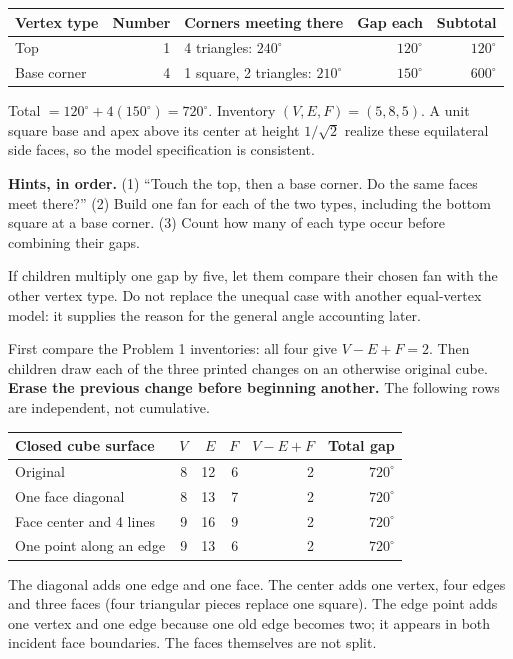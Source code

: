 \documentclass[11pt,letterpaper]{article}
\newcommand{\sub}[1]{\par\vspace{3pt}{\bfseries #1}\par}
\newcommand{\hints}[3]{\textbf{Hints, in order.} (1) #1 (2) #2 (3) #3\par}
\newcommand{\degc}{^{\circ}}
\begin{document}
\begin{center}
\begin{tabular}{|l|r|l|r|r|}\hline
Vertex type & Number & Corners meeting there & Gap each & Subtotal\\\hline
Top & 1 & 4 triangles: $240\degc$ & $120\degc$ & $120\degc$\\
Base corner & 4 & 1 square, 2 triangles: $210\degc$ & $150\degc$ & $600\degc$\\\hline
\end{tabular}
\end{center}
Total $=120\degc+4(150\degc)=720\degc$. Inventory $(V,E,F)=(5,8,5)$. A unit square base and apex above its center at height $1/\sqrt2$ realize these equilateral side faces, so the model specification is consistent.

\hints{``Touch the top, then a base corner. Do the same faces meet there?''}{Build one fan for each of the two types, including the bottom square at a base corner.}{Count how many of each type occur before combining their gaps.}
If children multiply one gap by five, let them compare their chosen fan with the other vertex type. Do not replace the unequal case with another equal-vertex model: it supplies the reason for the general angle accounting later.

\sub{Problem 6 / student p.6 / upper concrete core or return visit}
First compare the Problem 1 inventories: all four give $V-E+F=2$. Then children draw each of the three printed changes on an otherwise original cube. \textbf{Erase the previous change before beginning another.} The following rows are independent, not cumulative.

\begin{center}
\begin{tabular}{|l|r|r|r|r|r|}\hline
Closed cube surface & $V$ & $E$ & $F$ & $V-E+F$ & Total gap\\\hline
Original & 8 & 12 & 6 & 2 & $720\degc$\\
One face diagonal & 8 & 13 & 7 & 2 & $720\degc$\\
Face center and 4 lines & 9 & 16 & 9 & 2 & $720\degc$\\
One point along an edge & 9 & 13 & 6 & 2 & $720\degc$\\\hline
\end{tabular}
\end{center}
The diagonal adds one edge and one face. The center adds one vertex, four edges and three faces (four triangular pieces replace one square). The edge point adds one vertex and one edge because one old edge becomes two; it appears in both incident face boundaries. The faces themselves are not split.
\end{document}
